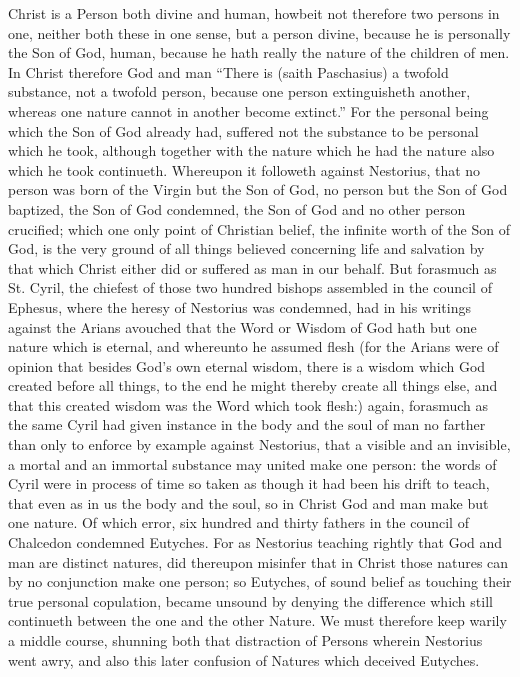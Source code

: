Christ is a Person both divine and human, howbeit not therefore two persons in one, neither both these in one sense, but a person divine, because he is personally the Son of God, human, because he hath really the nature of the children of men. In Christ therefore God and man “There is (saith Paschasius) a twofold substance, not a twofold person, because one person extinguisheth another, whereas one nature cannot in another become extinct.” For the personal being which the Son of God already had, suffered not the substance  to be personal which he took, although together with the nature which he had the nature also which he took continueth. Whereupon it followeth against Nestorius, that no person was born of the Virgin but the Son of God, no person but the Son of God baptized, the Son of God condemned, the Son of God and no other person crucified; which one only point of Christian belief, the infinite worth of the Son of God, is the very ground of all things believed concerning life and salvation by that which Christ either did or suffered as man in our behalf.
But forasmuch as St. Cyril, the chiefest of those two hundred bishops assembled in the council of Ephesus, where the heresy of Nestorius was condemned, had in his writings against the Arians avouched that the Word or Wisdom of God hath but one nature which is eternal, and whereunto he assumed flesh (for the Arians were of opinion that besides God’s own eternal wisdom, there is a wisdom which God created before all things, to the end he might thereby create all things else, and that this created wisdom was the Word which took flesh:) again, forasmuch as the same Cyril had given instance in the body and the soul of man no farther than only to enforce by example against Nestorius, that a visible and an invisible, a mortal and an immortal substance may united make one person: the words of Cyril were in process of time so taken as though it had been his drift to teach, that even as in us the body and the soul, so in Christ God and man make but one nature. Of which error, six hundred and thirty fathers in the council of Chalcedon condemned Eutyches. For as Nestorius teaching rightly that God and man are distinct natures, did thereupon misinfer that in Christ those natures can by no conjunction make one person; so Eutyches, of sound belief as touching their true personal copulation, became unsound by denying the difference which still continueth between the one and the other Nature. We must therefore keep warily a middle course, shunning both that distraction of Persons wherein Nestorius went awry, and also this later confusion of Natures which deceived Eutyches.
